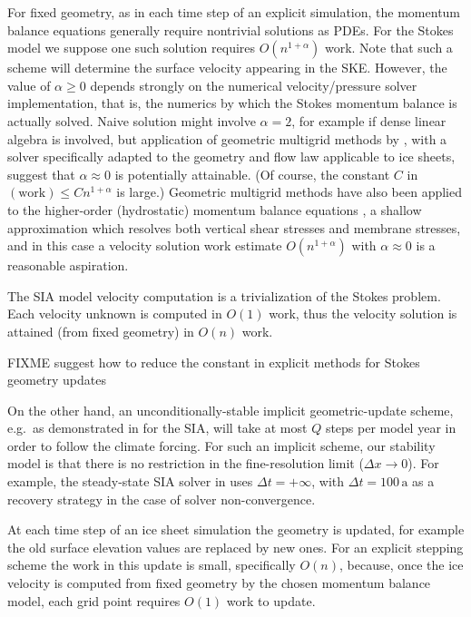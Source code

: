 \documentclass[twocolumn,letterpaper]{igs}
\begin{document}
For fixed geometry, as in each time step of an explicit simulation, the momentum balance equations generally require nontrivial solutions as PDEs.  For the Stokes model we suppose one such solution requires $O(n^{1+\alpha})$ work.  Note that such a scheme will determine the surface velocity appearing in the SKE.  However, the value of $\alpha \ge 0$ depends strongly on the numerical velocity/pressure solver implementation, that is, the numerics by which the Stokes momentum balance is actually solved.  Naive solution might involve $\alpha=2$, for example if dense linear algebra is involved, but application of geometric multigrid methods by \cite{IsaacStadlerGhattas2015}, with a solver specifically adapted to the geometry and flow law applicable to ice sheets, suggest that $\alpha \approx 0$ is potentially attainable.  (Of course, the constant $C$ in $(\text{work}) \le C n^{1+\alpha}$ is large.)  Geometric multigrid methods have also been applied to the higher-order (hydrostatic) momentum balance equations \citep{BrownSmithAhmadia2013}, a shallow approximation which resolves both vertical shear stresses and membrane stresses, and in this case a velocity solution work estimate $O(n^{1+\alpha})$ with $\alpha \approx 0$ is a reasonable aspiration.

The SIA model velocity computation is a trivialization of the Stokes problem.  Each velocity unknown is computed in $O(1)$ work, thus the velocity solution is attained (from fixed geometry) in $O(n)$ work.

FIXME \citep{LofgrenAhlkronaHelanow2021} suggest how to reduce the constant in explicit methods for Stokes geometry updates

On the other hand, an unconditionally-stable implicit geometric-update scheme, e.g.~as demonstrated in \citep{Bueler2016} for the SIA, will take at most $Q$ steps per model year in order to follow the climate forcing.  For such an implicit scheme, our stability model is that there is no restriction in the fine-resolution limit ($\Delta x \to 0$).  For example, the steady-state SIA solver in \cite{Bueler2016} uses $\Delta t=+\infty$, with $\Delta t = 100 \,\text{a}$ as a recovery strategy in the case of solver non-convergence.

At each time step of an ice sheet simulation the geometry is updated, for example the old surface elevation values are replaced by new ones.  For an explicit stepping scheme the work in this update is small, specifically $O(n)$, because, once the ice velocity is computed from fixed geometry by the chosen momentum balance model, each grid point requires $O(1)$ work to update.
\end{document}
